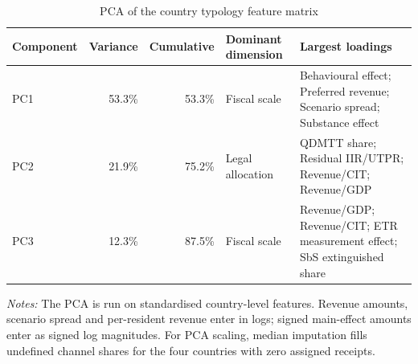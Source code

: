 \begin{table}[H]
\centering
\footnotesize
\setlength{\tabcolsep}{3pt}
\caption[PCA of the country typology feature matrix]{PCA of the country typology feature matrix}
\label{tab:country_typology_pca}
\begin{tabular}{@{}lrrL{3.0cm}L{6.0cm}@{}}
\toprule
Component & Variance & Cumulative & Dominant dimension & Largest loadings \\
\midrule
PC1 & 53.3\% & 53.3\% & Fiscal scale & Behavioural effect; Preferred revenue; Scenario spread; Substance effect \\
PC2 & 21.9\% & 75.2\% & Legal allocation & QDMTT share; Residual IIR/UTPR; Revenue/CIT; Revenue/GDP \\
PC3 & 12.3\% & 87.5\% & Fiscal scale & Revenue/GDP; Revenue/CIT; ETR measurement effect; SbS extinguished share \\
\bottomrule
\end{tabular}

\vspace{0.35em}
\noindent\begin{minipage}{\textwidth}
\footnotesize\raggedright\textit{Notes:} The PCA is run on standardised country-level features. Revenue amounts, scenario spread and per-resident revenue enter in logs; signed main-effect amounts enter as signed log magnitudes. For PCA scaling, median imputation fills undefined channel shares for the four countries with zero assigned receipts.
\end{minipage}
\end{table}
